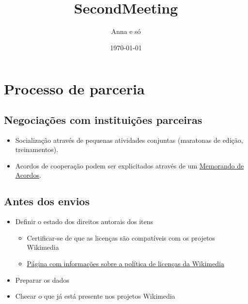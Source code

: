 \documentclass[presentation]{beamer}
\author{Anna e só}
\date{\today}
\title{SecondMeeting}
\begin{document}
\maketitle
\tableofcontents



\section{Processo de parceria}
\label{sec-1}
\subsection{Negociações com instituições parceiras}
\label{sec-1-1}
\begin{itemize}
\item Socialização através de pequenas atividades conjuntas (maratonas de edição, treinamentos).
\item Acordos de cooperação podem ser explicitados através de um \href{https://meta.wikimedia.org/wiki/Partnerships_\%26_Resource_Development/Drafting_a_Memorandum_of_Understanding}{Memorando de Acordos}.
\end{itemize}
\subsection{Antes dos envios}
\label{sec-1-2}
\begin{itemize}
\item Definir o estado dos direitos autorais dos itens
\begin{itemize}
\item Certificar-se de que as licenças são compatíveis com os projetos Wikimedia
\item \href{https://commons.wikimedia.org/wiki/Commons:Licensing}{Página com informações sobre a política de licenças da Wikimedia}
\end{itemize}
\item Preparar os dados
\item Checar o que já está presente nos projetos Wikimedia
\end{itemize}
\end{document}
